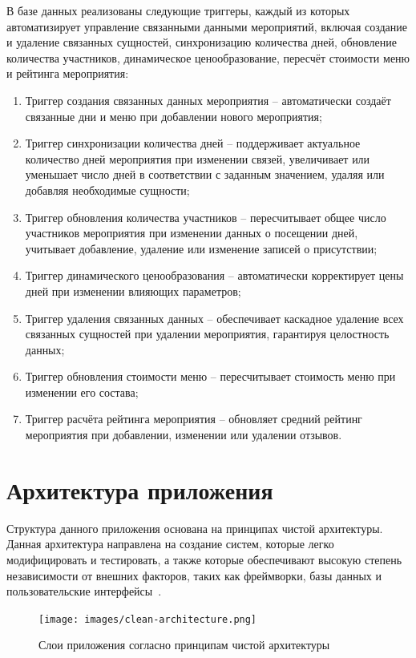 В базе данных реализованы следующие триггеры, каждый из которых автоматизирует управление связанными данными мероприятий, включая создание и удаление связанных сущностей, синхронизацию количества дней, обновление количества участников, динамическое ценообразование, пересчёт стоимости меню и рейтинга мероприятия:
\begin{enumerate}
	\item Триггер создания связанных данных мероприятия --  автоматически создаёт связанные дни и меню при добавлении нового мероприятия;
	\item Триггер синхронизации количества дней -- поддерживает актуальное количество дней мероприятия при изменении связей, увеличивает или уменьшает число дней в соответствии с заданным значением, удаляя или добавляя необходимые сущности;
	\item Триггер обновления количества участников -- пересчитывает общее число участников мероприятия при изменении данных о посещении дней, учитывает добавление, удаление или изменение записей о присутствии;
	\item Триггер динамического ценообразования -- автоматически корректирует цены дней при изменении влияющих параметров;
	\item Триггер удаления связанных данных -- обеспечивает каскадное удаление всех связанных сущностей при удалении мероприятия, гарантируя целостность данных;
	\item Триггер обновления стоимости меню -- пересчитывает стоимость меню при изменении его состава;
	\item Триггер расчёта рейтинга мероприятия -- обновляет средний рейтинг мероприятия при добавлении, изменении или удалении отзывов.
\end{enumerate}

\section{Архитектура приложения}

Структура данного приложения основана на принципах чистой архитектуры. Данная архитектура направлена на создание систем, которые легко модифицировать и тестировать, а также которые обеспечивают высокую степень независимости от внешних факторов, таких как фреймворки, базы данных и пользовательские интерфейсы~\cite{lit10}.

\begin{figure}[h]
	\centering
	\texttt{[image: images/clean-architecture.png]}
	\caption{Слои приложения согласно принципам чистой архитектуры} 
	\label{fig:clean-architecture} 
\end{figure}


